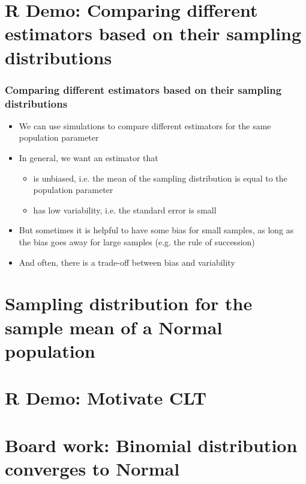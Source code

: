 \documentclass[t,compress,mathserif]{beamer}
\begin{document}

\section{R Demo: Comparing different estimators based on their sampling distributions}

\begin{frame}
    \frametitle{Comparing different estimators based on their sampling distributions}

    \begin{itemize}
        \item We can use simulations to compare different estimators for the same population parameter
        \item In general, we want an estimator that
        \begin{itemize}
            \item is unbiased, i.e. the mean of the sampling distribution is equal to the population parameter
            \item has low variability, i.e. the standard error is small
        \end{itemize}
        \item But sometimes it is helpful to have some bias for small samples, as long as the bias goes away for large samples (e.g. the rule of succession)
        \item And often, there is a trade-off between bias and variability
    \end{itemize}
\end{frame}


\section{Sampling distribution for the sample mean of a Normal population}


\section{R Demo: Motivate CLT}



\section{Board work: Binomial distribution converges to Normal}
\end{document}
